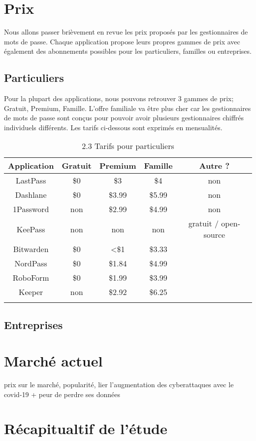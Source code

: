 \section{Prix}
Nous allons passer brièvement en revue les prix proposés par les gestionnaires de mots de passe. Chaque application propose leurs propres gammes de prix avec également des abonnements possibles pour les particuliers, familles ou entreprises. 
\subsection{Particuliers}
Pour la plupart des applications, nous pouvons retrouver 3 gammes de prix; Gratuit, Premium, Famille. L'offre familiale va être plus cher car les gestionnaires de mots de passe sont conçus pour pouvoir avoir plusieurs gestionnaires chiffrés individuels différents. 
Les tarifs ci-dessous sont exprimés en mensualités. \\
\begin{longtable}[h]{|c|c|c|c|c|}
    \hline
	Application & Gratuit & Premium & Famille & Autre ? \\
	\hline
	LastPass & \$0 & \$3 & \$4 & non \\
	\hline
	Dashlane & \$0 & \$3.99 & \$5.99 &  non \\
	\hline
	1Password & non & \$2.99 & \$4.99 & non \\
	\hline
	KeePass & non & non & non & gratuit / open-source  \\
	\hline
	Bitwarden & \$0 & <\$1 & \$3.33 &  \\
	\hline
	NordPass & \$0 & \$1.84 & \$4.99 &  \\
	\hline
	RoboForm & \$0 & \$1.99 & \$3.99 &   \\
	\hline
	Keeper & non & \$2.92 & \$6.25 &   \\
	\hline
    \caption{2.3 Tarifs pour particuliers}
\end{longtable}
\subsection{Entreprises}
\section{Marché actuel}
prix sur le marché, popularité, lier l'augmentation des cyberattaques avec le covid-19 + peur de perdre ses données
\section{Récapitualtif de l'étude}
